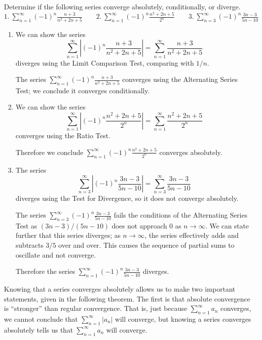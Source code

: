 \documentclass[10pt]{article}
\newcommand{\ds}{\displaystyle}
\begin{document}
{
Determine if the following series converge absolutely, conditionally, or diverge.\\

\noindent$\ds 1.\ \sum_{n=1}^\infty (-1)^n\frac{n+3}{n^2+2n+5}\qquad 2.\ \sum_{n=1}^\infty (-1)^n\frac{n^2+2n+5}{2^n}\qquad 3.\ \sum_{n=3}^\infty (-1)^n\frac{3n-3}{5n-10}$
}
{\begin{enumerate}
	\item We can show the series $$\ds \sum_{n=1}^\infty \left|(-1)^n\frac{n+3}{n^2+2n+5}\right|= \sum_{n=1}^\infty \frac{n+3}{n^2+2n+5}$$ diverges using the Limit Comparison Test, comparing with $1/n$. 
	
	The series $\ds \sum_{n=1}^\infty (-1)^n\frac{n+3}{n^2+2n+5}$ converges using the Alternating Series Test; we conclude it converges conditionally.
	
	\item	We can show the series $$\ds \sum_{n=1}^\infty \left|(-1)^n\frac{n^2+2n+5}{2^n}\right|=\sum_{n=1}^\infty \frac{n^2+2n+5}{2^n}$$  converges using the Ratio Test. 
	
	Therefore we conclude $\ds \sum_{n=1}^\infty (-1)^n\frac{n^2+2n+5}{2^n}$ converges absolutely.
	
	\item	The series $$\ds \sum_{n=3}^\infty \left|(-1)^n\frac{3n-3}{5n-10}\right| = \sum_{n=3}^\infty \frac{3n-3}{5n-10}$$ diverges using the Test for Divergence, so it does not converge absolutely. 
	
	The series $\ds \sum_{n=3}^\infty (-1)^n\frac{3n-3}{5n-10}$ fails the conditions of the Alternating Series Test as $(3n-3)/(5n-10)$ does not approach $0$ as $n\to\infty$. We can state further that this series diverges; as $n\to\infty$, the series effectively adds and subtracts $3/5$ over and over. This causes the sequence of partial sums to oscillate and not converge.
	
	Therefore the series $\ds \sum_{n=1}^\infty (-1)^n\frac{3n-3}{5n-10}$ diverges.
\end{enumerate}
}

Knowing that a series converges absolutely allows us to make two important statements, given in the following theorem. The first is that absolute convergence is  ``stronger'' than regular convergence. That is, just because {\small$\ds \sum_{n=1}^\infty a_n$} converges, we cannot conclude that {\small$\ds \sum_{n=1}^\infty |a_n|$} will converge, but knowing a series converges absolutely tells us that {\small$\ds \sum_{n=1}^\infty a_n$} will converge. 
\end{document}
